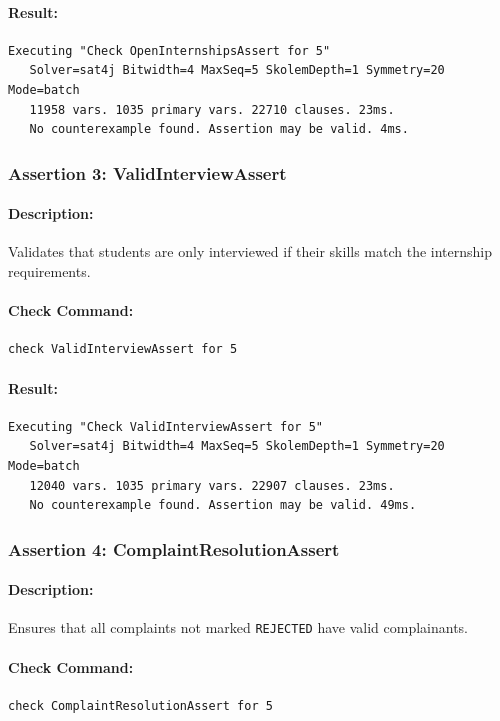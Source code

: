 \paragraph{Result:} 
\begin{verbatim}
Executing "Check OpenInternshipsAssert for 5"
   Solver=sat4j Bitwidth=4 MaxSeq=5 SkolemDepth=1 Symmetry=20 Mode=batch
   11958 vars. 1035 primary vars. 22710 clauses. 23ms.
   No counterexample found. Assertion may be valid. 4ms.
\end{verbatim}

\subsubsection{Assertion 3: ValidInterviewAssert}
\paragraph{Description:} Validates that students are only interviewed if their skills match the internship requirements.
\paragraph{Check Command:}
\begin{verbatim}
check ValidInterviewAssert for 5
\end{verbatim}
\paragraph{Result:} 
\begin{verbatim}
Executing "Check ValidInterviewAssert for 5"
   Solver=sat4j Bitwidth=4 MaxSeq=5 SkolemDepth=1 Symmetry=20 Mode=batch
   12040 vars. 1035 primary vars. 22907 clauses. 23ms.
   No counterexample found. Assertion may be valid. 49ms.
\end{verbatim}

\subsubsection{Assertion 4: ComplaintResolutionAssert}
\paragraph{Description:} Ensures that all complaints not marked \texttt{REJECTED} have valid complainants.
\paragraph{Check Command:}
\begin{verbatim}
check ComplaintResolutionAssert for 5
\end{verbatim}
